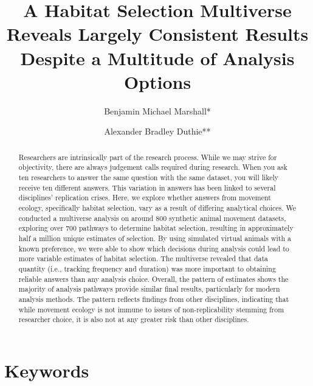 \documentclass[10pt,a4paper]{article}
\begin{document}
\pagestyle{fancy}

\title{A Habitat Selection Multiverse Reveals Largely Consistent Results Despite a Multitude of Analysis Options}
\author[1]{Benjamin Michael Marshall*}
\author[1]{Alexander Bradley Duthie**}


\maketitle
\thispagestyle{fancy}

\begin{abstract}

Researchers are intrinsically part of the research process. While we may strive for objectivity, there are always judgement calls required during research. When you ask ten researchers to answer the same question with the same dataset, you will likely receive ten different answers. This variation in answers has been linked to several disciplines' replication crises. Here, we explore whether answers from movement ecology, specifically habitat selection, vary as a result of differing analytical choices. We conducted a multiverse analysis on around 800 synthetic animal movement datasets, exploring over 700 pathways to determine habitat selection, resulting in approximately half a million unique estimates of selection. By using simulated virtual animals with a known preference, we were able to show which decisions during analysis could lead to more variable estimates of habitat selection. The multiverse revealed that data quantity (i.e., tracking frequency and duration) was more important to obtaining reliable answers than any analysis choice. Overall, the pattern of estimates shows the majority of analysis pathways provide similar final results, particularly for modern analysis methods. The pattern reflects findings from other disciplines, indicating that while movement ecology is not immune to issues of non-replicability stemming from researcher choice, it is also not at any greater risk than other disciplines.

\end{abstract}

\section*{Keywords}
\end{document}
